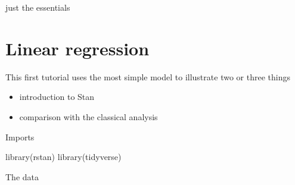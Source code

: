 \documentclass[
]{article}
\newenvironment{Shaded}{\begin{snugshade}}{\end{snugshade}}
\newcommand{\FunctionTok}[1]{\textcolor[rgb]{0.00,0.00,0.00}{#1}}
\newcommand{\NormalTok}[1]{#1}
\providecommand{\tightlist}{%
  \setlength{\itemsep}{0pt}\setlength{\parskip}{0pt}}
\begin{document}
just the essentials

\hypertarget{linear-regression}{%
\section{Linear regression}\label{linear-regression}}

This first tutorial uses the most simple model to illustrate two or three things

\begin{itemize}
\tightlist
\item
  introduction to Stan
\item
  comparison with the classical analysis
\end{itemize}

Imports

\begin{Shaded}
\begin{Highlighting}[]
\FunctionTok{library}\NormalTok{(rstan)}
\FunctionTok{library}\NormalTok{(tidyverse)}
\end{Highlighting}
\end{Shaded}

The data
\end{document}
